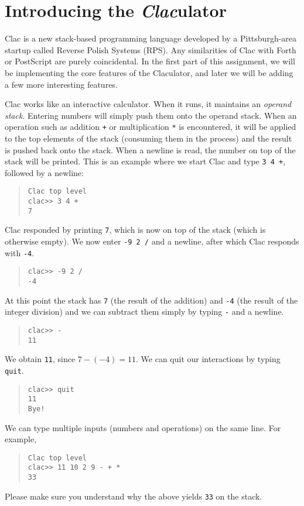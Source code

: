 \documentclass[12pt]{exam}
\begin{document}
\section{Introducing the \emph{Clac}ulator}
\label{sec:demo}

Clac is a new stack-based programming language developed by a
Pittsburgh-area startup called Reverse Polish Systems (RPS).  Any
similarities of Clac with Forth or PostScript are purely coincidental.
In the first part of this assignment, we will be implementing the core
features of the Claculator, and later we will be adding a few more
interesting features.

Clac works like an interactive calculator.  When it runs, it maintains
an \emph{operand stack}.  Entering numbers will simply push them onto
the operand stack.  When an operation such as addition \lstinline'+' or
multiplication \lstinline'*' is encountered, it will be applied to the top
elements of the stack (consuming them in the process) and the result
is pushed back onto the stack.  When a newline is read, the number on
top of the stack will be printed.  This is an example where we start Clac
and type \lstinline'3 4 +', followed by a newline:
\begin{quote}
\begin{lstlisting}[language={[clac]C}]
% ./clac
Clac top level
clac>> 3 4 +
7
\end{lstlisting}
\end{quote}
Clac responded by printing \lstinline'7', which is now on top of the stack
(which is otherwise empty).  We now enter \lstinline'-9 2 /' and a newline,
after which Clac responds with \lstinline'-4'.
\begin{quote}
\begin{lstlisting}[language={[clac]C}]
clac>> -9 2 /
-4
\end{lstlisting}
\end{quote}
At this point the stack has \lstinline'7' (the result of the addition)
and \lstinline'-4' (the result of the integer division) and we can
subtract them simply by typing \lstinline'-' and a newline.
\begin{quote}
\begin{lstlisting}[language={[clac]C}]
clac>> -
11
\end{lstlisting}
\end{quote}
We obtain \lstinline'11', since $7-(-4) = 11$.  We can quit our interactions by
typing \lstinline'quit'.
\begin{quote}
\begin{lstlisting}[language={[clac]C}]
clac>> quit
11
Bye!
\end{lstlisting}
\end{quote}
We can type multiple inputs (numbers and operations) on
the same line.  For example,
\begin{quote}
\begin{lstlisting}[language={[clac]C}]
% ./clac
Clac top level
clac>> 11 10 2 9 - + *
33
\end{lstlisting}
\end{quote}
Please make sure you understand why the above yields \lstinline'33'
on the stack.
\end{document}

